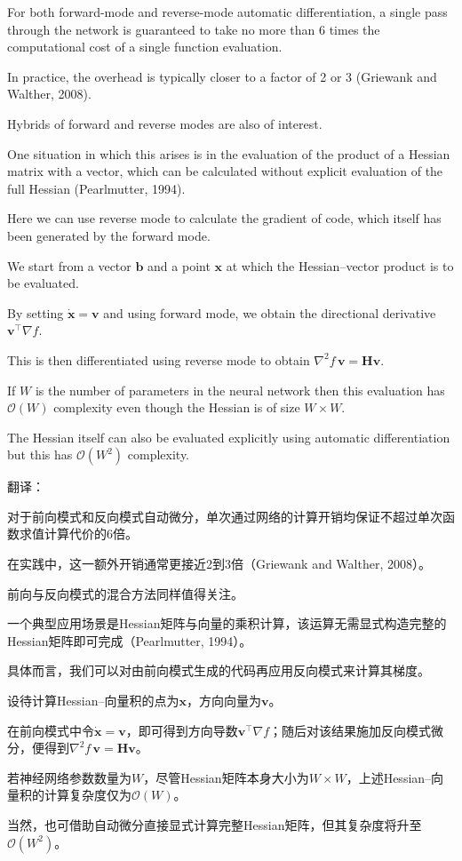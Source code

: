 \documentclass{article}
\begin{document}
For both forward-mode and reverse-mode automatic differentiation, a single pass through the network is guaranteed to take no more than 6 times the computational cost of a single function evaluation. 

In practice, the overhead is typically closer to a factor of 2 or 3 (Griewank and Walther, 2008). 

Hybrids of forward and reverse modes are also of interest. 

One situation in which this arises is in the evaluation of the product of a Hessian matrix with a vector, which can be calculated without explicit evaluation of the full Hessian (Pearlmutter, 1994). 

Here we can use reverse mode to calculate the gradient of code, which itself has been generated by the forward mode. 

We start from a vector $\mathbf{b}$ and a point $\mathbf{x}$ at which the Hessian--vector product is to be evaluated. 

By setting $\dot{\mathbf{x}} = \mathbf{v}$ and using forward mode, we obtain the directional derivative $\mathbf{v}^\top \nabla f$. 

This is then differentiated using reverse mode to obtain $\nabla^2 f \, \mathbf{v} = \mathbf{H} \mathbf{v}$. 

If $W$ is the number of parameters in the neural network then this evaluation has $\mathcal{O}(W)$ complexity even though the Hessian is of size $W \times W$. 

The Hessian itself can also be evaluated explicitly using automatic differentiation but this has $\mathcal{O}(W^2)$ complexity.

{\color{red}
翻译：

对于前向模式和反向模式自动微分，单次通过网络的计算开销均保证不超过单次函数求值计算代价的6倍。

在实践中，这一额外开销通常更接近2到3倍（Griewank and Walther, 2008）。

前向与反向模式的混合方法同样值得关注。

一个典型应用场景是Hessian矩阵与向量的乘积计算，该运算无需显式构造完整的Hessian矩阵即可完成（Pearlmutter, 1994）。

具体而言，我们可以对由前向模式生成的代码再应用反向模式来计算其梯度。

设待计算Hessian--向量积的点为$\mathbf{x}$，方向向量为$\mathbf{v}$。

在前向模式中令$\dot{\mathbf{x}} = \mathbf{v}$，即可得到方向导数$\mathbf{v}^\top \nabla f$；随后对该结果施加反向模式微分，便得到$\nabla^2 f \, \mathbf{v} = \mathbf{H} \mathbf{v}$。

若神经网络参数数量为$W$，尽管Hessian矩阵本身大小为$W \times W$，上述Hessian--向量积的计算复杂度仅为$\mathcal{O}(W)$。

当然，也可借助自动微分直接显式计算完整Hessian矩阵，但其复杂度将升至$\mathcal{O}(W^2)$。
}
\end{document}
